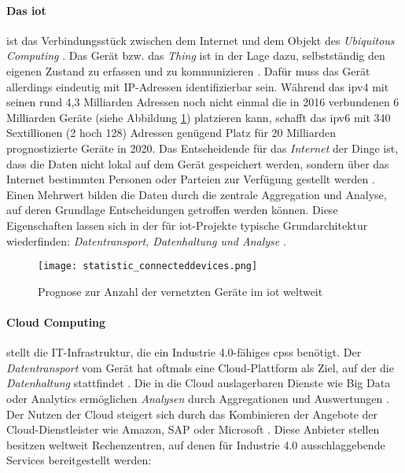 \paragraph{Das \acf{iot}} ist das Verbindungsstück zwischen dem Internet und dem Objekt des \textit{Ubiquitous Computing} \citep{Roth2016}. Das Gerät bzw. das \textit{Thing} ist in der Lage dazu, selbstständig den eigenen Zustand zu erfassen und zu kommunizieren \citep{Kenn2016}. Dafür muss das Gerät allerdings eindeutig mit IP-Adressen identifizierbar sein. Während das \acf{ipv4} mit seinen rund 4,3 Milliarden Adressen noch nicht einmal die in 2016 verbundenen 6 Milliarden Geräte (siehe Abbildung \ref{fig:connecteddevices}) platzieren kann, schafft das \ac{ipv6} mit 340 Sextillionen (2 hoch 128) Adressen genügend Platz für 20 Milliarden prognostizierte Geräte in 2020. Das Entscheidende für das \textit{Internet} der Dinge ist, dass die Daten nicht lokal auf dem Gerät gespeichert werden, sondern über das Internet bestimmten Personen oder Parteien zur Verfügung gestellt werden \citep{Hanisch2017}. Einen Mehrwert bilden die Daten durch die zentrale Aggregation und Analyse, auf deren Grundlage Entscheidungen getroffen werden können. Diese Eigenschaften lassen sich in der für \ac{iot}-Projekte typische Grundarchitektur wiederfinden: \textit{Datentransport, Datenhaltung und Analyse} \citep{Kenn2016}.

\begin{figure}[ht]
  \centering
  \texttt{[image: statistic\_connecteddevices.png]}
  \caption[Prognose zur Anzahl der vernetzten Geräte im \ac{iot} weltweit]{Prognose zur Anzahl der vernetzten Geräte im \ac{iot} weltweit \citep{Gartner2017a}}\label{fig:connecteddevices}
\end{figure}

\paragraph{Cloud Computing} stellt die IT-Infrastruktur, die ein Industrie 4.0-fähiges \ac{cpss} benötigt. Der \textit{Datentransport} vom Gerät hat oftmals eine Cloud-Plattform als Ziel, auf der die \textit{Datenhaltung} stattfindet \citep{Elsner2018}. Die in die Cloud auslagerbaren Dienste wie Big Data oder Analytics ermöglichen \textit{Analysen} durch Aggregationen und Auswertungen \citep{Roth2016}. Der Nutzen der Cloud steigert sich durch das Kombinieren der Angebote der Cloud-Dienstleister wie Amazon, SAP oder Microsoft \citep{Hnisch2017}. Diese Anbieter stellen besitzen weltweit Rechenzentren, auf denen für Industrie 4.0 ausschlaggebende Services bereitgestellt werden:


